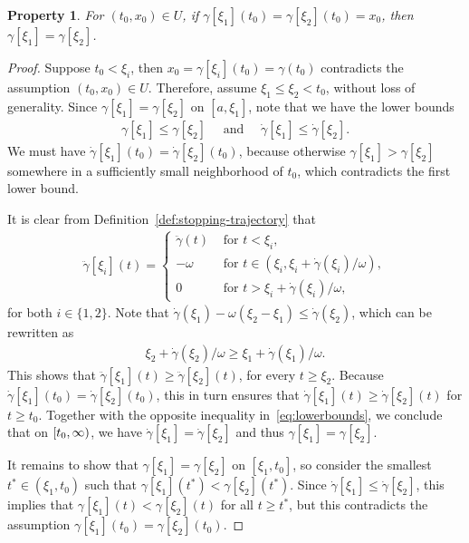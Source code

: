 \documentclass[a4paper]{article}
\theoremstyle{definition}
\theoremstyle{plain}
\newtheorem{property}{Property\hspace{0.25em}\ignorespaces}
\begin{document}
\begin{property}\label{prop:xi-unique}
  For $(t_{0}, x_{0}) \in U$, if
  $\gamma[\xi_{1}](t_{0}) = \gamma[\xi_{2}](t_{0}) = x_{0}$, then
  $\gamma[\xi_{1}] = \gamma[\xi_{2}]$.
\end{property}
\begin{proof}
  Suppose $t_{0} < \xi_{i}$, then $x_{0} = \gamma[\xi_{i}](t_{0}) = \gamma(t_{0})$ contradicts the assumption $(t_{0}, x_{0}) \in U$.
  Therefore, assume $\xi_{1} \leq \xi_{2} < t_{0}$, without loss of generality.
  Since $\gamma[\xi_{1}] = \gamma[\xi_{2}]$ on $[a, \xi_{1}]$, note that
  we have the lower bounds
  \begin{align}\label{eq:lowerbounds}
    \gamma[\xi_{1}] \leq \gamma[\xi_{2}] \quad \text{ and } \quad \dot{\gamma}[\xi_{1}] \leq \dot{\gamma}[\xi_{2}].
  \end{align}
  We must have $\dot{\gamma}[\xi_{1}](t_{0}) = \dot{\gamma}[\xi_{2}](t_{0})$,
  because otherwise $\gamma[\xi_{1}] > \gamma[\xi_{2}]$ somewhere in a
  sufficiently small neighborhood of $t_{0}$, which contradicts the first lower
  bound.

  It is clear from Definition~\ref{def:stopping-trajectory} that
  \begin{align*}
    \ddot{\gamma}[\xi_{i}](t) =
    \begin{cases}
      \ddot{\gamma}(t) & \text{ for } t < \xi_{i} , \\
      - \omega & \text{ for } t \in (\xi_{i}, \xi_{i} + \dot{\gamma}(\xi_{i})/\omega) , \\
      0 & \text{ for } t > \xi_{i} + \dot{\gamma}(\xi_{i})/ \omega ,
    \end{cases}
  \end{align*}
  for both $i \in \{ 1, 2\}$.
  Note that
  $\dot{\gamma}(\xi_{1}) - \omega(\xi_{2}-\xi_{1}) \leq \dot{\gamma}(\xi_{2})$,
  which can be rewritten as
  \begin{align*}
    \xi_{2} + \dot{\gamma}(\xi_{2}) / \omega \geq \xi_{1} + \dot{\gamma}(\xi_{1}) / \omega .
  \end{align*}
  This shows that $\ddot{\gamma}[\xi_{1}](t) \geq \ddot{\gamma}[\xi_{2}](t)$, for every
  $t \geq \xi_{2}$. Because
  $\dot{\gamma}[\xi_{1}](t_{0}) = \dot{\gamma}[\xi_{2}](t_{0})$, this in turn
  ensures that $\dot{\gamma}[\xi_{1}](t) \geq \dot{\gamma}[\xi_{2}](t)$ for $t \geq t_{0}$.
  Together with the opposite inequality in~\eqref{eq:lowerbounds}, we conclude
  that on $[t_{0},\infty)$, we have $\dot{\gamma}[\xi_{1}] = \dot{\gamma}[\xi_{2}]$
  and thus $\gamma[\xi_{1}] = \gamma[\xi_{2}]$.

  It remains to show that $\gamma[\xi_{1}] = \gamma[\xi_{2}]$ on $[\xi_{1}, t_{0}]$, so consider the smallest
  $t^{*} \in (\xi_{1}, t_{0})$ such that $\gamma[\xi_{1}](t^{*}) < \gamma[\xi_{2}](t^{*})$.
  Since $\dot{\gamma}[\xi_{1}] \leq \dot{\gamma}[\xi_{2}]$, this implies that $\gamma[\xi_{1}](t) < \gamma[\xi_{2}](t)$ for
  all $t \geq t^{*}$, but this contradicts the assumption $\gamma[\xi_{1}](t_{0}) = \gamma[\xi_{2}](t_{0})$.
\end{proof}
\end{document}
